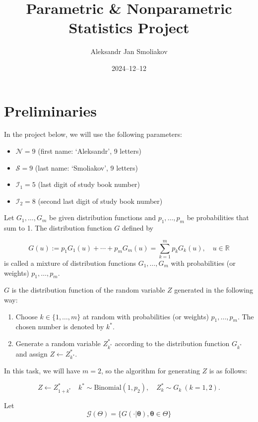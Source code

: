 \documentclass{article}
\title{Parametric \& Nonparametric Statistics Project}
\author{Aleksandr Jan Smoliakov}
\date{2024--12--12}
\begin{document}
\maketitle

\section{Preliminaries}

In the project below, we will use the following parameters:
\begin{itemize}
    \item $\mathcal{N} = 9$ (first name: `Aleksandr', 9 letters)
    \item $\mathcal{S} = 9$ (last name: `Smoliakov', 9 letters)
    \item $\mathcal{I}_1 = 5$ (last digit of study book number)
    \item $\mathcal{I}_2 = 8$ (second last digit of study book number)
\end{itemize}

Let \(G_1, \ldots, G_m\) be given distribution functions and \(p_1, \ldots, p_m\) be probabilities that sum to 1. The distribution function \(G\) defined by

\[
G(u) := p_1 G_1(u) + \cdots + p_m G_m(u) = \sum_{k=1}^m p_k G_k(u), \quad u \in \mathbb{R}
\]
is called a mixture of distribution functions \(G_1, \ldots, G_m\) with probabilities (or weights) \(p_1, \ldots, p_m\).

\(G\) is the distribution function of the random variable \(Z\) generated in the following way:

\begin{enumerate}
    \item Choose \(k \in \{1, \ldots, m\}\) at random with probabilities (or weights) \(p_1, \ldots, p_m\). The chosen number is denoted by \(k^*\).
    \item Generate a random variable \(Z^*_{k^*}\) according to the distribution function \(G_{k^*}\) and assign \(Z \leftarrow Z^*_{k^*}\).
\end{enumerate}

In this task, we will have \(m = 2\), so the algorithm for generating \(Z\) is as follows:

\[
Z \leftarrow Z^*_{1+k^*} \quad k^* \sim \text{Binomial}(1, p_2), \quad Z^*_{k} \sim G_k \ (k = 1, 2).
\]

Let
\[
\mathcal{G}(\Theta) = \{G(\cdot|\boldsymbol{\theta}), \boldsymbol{\theta} \in \Theta\}
\]
\end{document}
